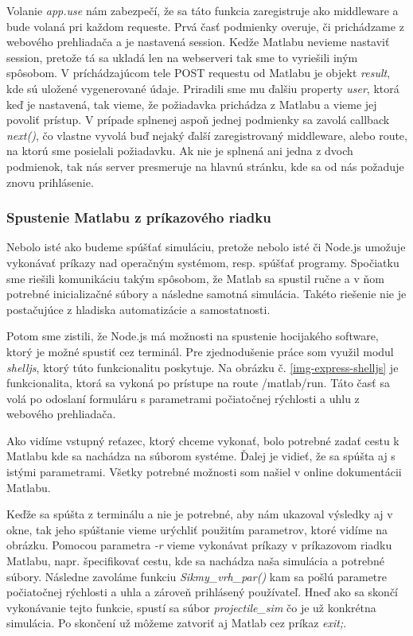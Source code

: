 Volanie \textit{app.use} nám zabezpečí, že sa táto funkcia zaregistruje ako middleware a bude volaná pri každom requeste. Prvá časť podmienky overuje, či prichádzame z webového prehliadača a je nastavená session. Kedže Matlabu nevieme nastaviť session, pretože tá sa ukladá len na webserveri tak sme to vyriešili iným spôsobom. V príchádzajúcom tele POST requestu od Matlabu je objekt \textit{result}, kde sú uložené vygenerované údaje. Priradili sme mu ďalšiu property \textit{user}, ktorá keď je nastavená, tak vieme, že požiadavka prichádza z Matlabu a vieme jej povoliť prístup. V prípade splnenej aspoň jednej podmienky sa zavolá callback \textit{next()}, čo vlastne vyvolá buď nejaký ďalší zaregistrovaný middleware, alebo route, na ktorú sme posielali požiadavku.
Ak nie je splnená ani jedna z dvoch podmienok, tak nás server presmeruje na hlavnú stránku, kde sa od nás požaduje znovu prihlásenie.


\subsubsection{Spustenie Matlabu z príkazového riadku}
Nebolo isté ako budeme spúšťať simuláciu, pretože nebolo isté či Node.js umožuje vykonávať príkazy nad operačným systémom, resp. spúšťať programy. Spočiatku sme riešili komunikáciu takým spôsobom, že Matlab sa spustil ručne a v ňom potrebné inicializačné súbory a následne samotná simulácia. Takéto riešenie nie je postačujúce z hladiska automatizácie a samostatnosti.

Potom sme zistili, že Node.js má možnosti na spustenie hocijakého software, ktorý je možné spustiť cez terminál. Pre zjednodušenie práce som využil modul \textit{shelljs}, ktorý túto funkcionalitu poskytuje. Na obrázku č. \ref{img-express-shelljs} je funkcionalita, ktorá sa vykoná po prístupe na route /matlab/run. Táto časť sa volá po odoslaní formuláru s parametrami počiatočnej rýchlosti a uhlu z webového prehliadača.

Ako vidíme vstupný reťazec, ktorý chceme vykonať, bolo potrebné zadať cestu k Matlabu kde sa nachádza na súborom systéme. Ďalej je vidieť, že sa spúšta aj s istými parametrami. Všetky potrebné možnosti som našiel v online dokumentácii Matlabu. \cite{matlab-macos}

Keďže sa spúšta z terminálu a nie je potrebné, aby nám ukazoval výsledky aj v okne, tak jeho spúštanie vieme urýchliť použitím parametrov, ktoré vidíme na obrázku. Pomocou parametra \textit{-r} vieme vykonávat príkazy v príkazovom riadku Matlabu, napr. špecifikovať cestu, kde sa nachádza naša simulácia a potrebné súbory. Následne zavoláme funkciu \textit{Sikmy\_vrh\_par()} kam sa pošlú parametre počiatočnej rýchlosti a uhla a zároveň prihlásený používateľ. Hneď ako sa skončí vykonávanie tejto funkcie, spustí sa súbor \textit{projectile\_sim} čo je už konkrétna simulácia. Po skončení už môžeme zatvoriť aj Matlab cez príkaz \textit{exit;}.

